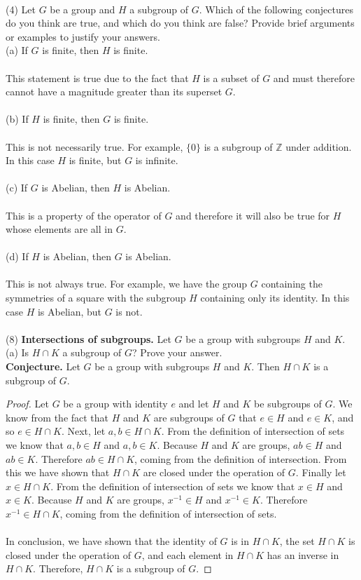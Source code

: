 \documentclass[11pt,a4paper]{article}
\begin{document}
~\\
(4) Let $G$ be a group and $H$ a subgroup of $G$. Which of the following conjectures do you think are true, and which do you think are false? Provide brief arguments or examples to justify your answers.\\
(a) If $G$ is finite, then $H$ is finite.\\
~\\
This statement is true due to the fact that $H$ is a subset of $G$ and must therefore cannot have a magnitude greater than its superset $G$.\\
~\\
(b) If $H$ is finite, then $G$ is finite.\\
~\\
This is not necessarily true. For example, $\{0\}$ is a subgroup of $\mathbb{Z}$ under addition. In this case $H$ is finite, but $G$ is infinite.\\
~\\
(c) If $G$ is Abelian, then $H$ is Abelian.\\
~\\
This is a property of the operator of $G$ and therefore it will also be true for $H$ whose elements are all in $G$.\\
~\\
(d) If $H$ is Abelian, then $G$ is Abelian.\\
~\\
This is not always true. For example, we have the group $G$ containing the symmetries of a square with the subgroup $H$ containing only its identity. In this case $H$ is Abelian, but $G$ is not.\\
~\\
(8) {\bf Intersections of subgroups.} Let $G$ be a group with subgroups $H$ and $K$.\\
(a) Is $H \cap K$ a subgroup of $G$? Prove your answer.\\
{\bf Conjecture.} Let $G$ be a group with subgroups $H$ and $K$. Then $H \cap K$ is a subgroup of $G$.
\begin{proof}
Let $G$ be a group with identity $e$ and let $H$ and $K$ be subgroups of $G$. We know from the fact that $H$ and $K$ are subgroups of $G$ that $e\in H$ and $e\in K$, and so $e\in H\cap K$. Next, let $a,b\in H\cap K$. From the definition of intersection of sets we know that $a,b\in H$ and $a,b\in K$. Because $H$ and $K$ are groups, $ab\in H$ and $ab\in K$. Therefore $ab\in H\cap K$, coming from the definition of intersection. From this we have shown that $H\cap K$ are closed under the operation of $G$. Finally let $x\in H\cap K$. From the definition of intersection of sets we know that $x\in H$ and $x\in K$. Because $H$ and $K$ are groups, $x^{-1}\in H$ and $x^{-1}\in K$. Therefore $x^{-1}\in H\cap K$, coming from the definition of intersection of sets.\\
~\\
In conclusion, we have shown that the identity of $G$ is in $H\cap K$, the set $H\cap K$ is closed under the operation of $G$, and each element in $H\cap K$ has an inverse in $H\cap K$. Therefore, $H\cap K$ is a subgroup of $G$.
\end{proof}
\end{document}
